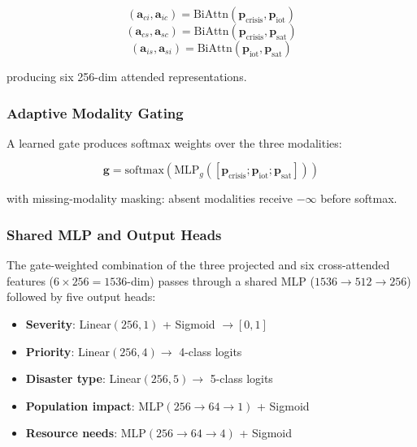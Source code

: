 \documentclass[journal]{IEEEtran}
\begin{document}
\begin{equation}
(\mathbf{a}_{ci}, \mathbf{a}_{ic}) = \text{BiAttn}(\mathbf{p}_\text{crisis}, \mathbf{p}_\text{iot})
\end{equation}
\begin{equation}
(\mathbf{a}_{cs}, \mathbf{a}_{sc}) = \text{BiAttn}(\mathbf{p}_\text{crisis}, \mathbf{p}_\text{sat})
\end{equation}
\begin{equation}
(\mathbf{a}_{is}, \mathbf{a}_{si}) = \text{BiAttn}(\mathbf{p}_\text{iot}, \mathbf{p}_\text{sat})
\end{equation}

producing six 256-dim attended representations.

\subsubsection{Adaptive Modality Gating}

A learned gate produces softmax weights over the three modalities:

\begin{equation}
\mathbf{g} = \text{softmax}(\text{MLP}_g([\mathbf{p}_\text{crisis}; \mathbf{p}_\text{iot}; \mathbf{p}_\text{sat}]))
\end{equation}

with missing-modality masking: absent modalities receive $-\infty$ before softmax.

\subsubsection{Shared MLP and Output Heads}

The gate-weighted combination of the three projected and six cross-attended features ($6 \times 256 = 1536$-dim) passes through a shared MLP ($1536 \to 512 \to 256$) followed by five output heads:

\begin{itemize}
    \item \textbf{Severity}: Linear$(256,1)$ + Sigmoid $\to [0,1]$
    \item \textbf{Priority}: Linear$(256,4) \to$ 4-class logits
    \item \textbf{Disaster type}: Linear$(256,5) \to$ 5-class logits
    \item \textbf{Population impact}: MLP$(256 \to 64 \to 1)$ + Sigmoid
    \item \textbf{Resource needs}: MLP$(256 \to 64 \to 4)$ + Sigmoid
\end{itemize}
\end{document}
